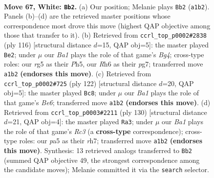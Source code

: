 \documentclass[11pt]{article}
\begin{document}
\clearpage

\begin{figure}[p]\centering
\begin{subfigure}{0.46\textwidth}\centering
\resizebox{\linewidth}{!}{%
\newchessgame
\chessboard[
  setfen={8/4k3/7R/pp4r1/b1p5/P1P5/3K4/B7 w - - 40 67},
  showmover=false,
  pgfstyle=straightmove, color=movearrow, markmove={a1-b2}
]}
\caption{}
\end{subfigure}\hfill
\begin{subfigure}{0.46\textwidth}\centering
\resizebox{\linewidth}{!}{%
\newchessgame
\chessboard[
  setfen={8/p5p1/Pbk4p/7P/4KPB1/8/8/8 w - - 23 59},
  showmover=false,
  pgfstyle=straightmove, color=movearrow, markmove={g4-e2}
]}
\caption{}
\end{subfigure}
\\[4pt]
\begin{subfigure}{0.46\textwidth}\centering
\resizebox{\linewidth}{!}{%
\newchessgame
\chessboard[
  setfen={8/8/4B3/1p4p1/3k1b1p/1P5P/6K1/8 w - - 2 62},
  showmover=false,
  pgfstyle=straightmove, color=movearrow, markmove={e6-c8}
]}
\caption{}
\end{subfigure}\hfill
\begin{subfigure}{0.46\textwidth}\centering
\resizebox{\linewidth}{!}{%
\newchessgame
\chessboard[
  setfen={1R6/3b3r/3P1k2/5p2/4p3/2R1P3/5K2/8 w - - 1 66},
  showmover=false,
  pgfstyle=straightmove, color=movearrow, markmove={c3-a3}
]}
\caption{}
\end{subfigure}
\caption{\textbf{Move 67, White: \texttt{Bb2}.} (a) Our position; Melanie plays \texttt{Bb2} (\texttt{a1b2}). Panels (b)--(d) are the retrieved master positions whose correspondence most drove this move (highest QAP objective among those that transfer to it). (b) Retrieved from \texttt{ccrl\_top\_p0002\#2838} (ply 116) [structural distance $d$=15, QAP obj=5]: the master played \texttt{Be2}; under $\mu$ our \emph{Ba1} plays the role of that game's \emph{Bg4}; cross-type roles: our \emph{r}g5 as their \emph{P}h5, our \emph{R}h6 as their \emph{p}g7; transferred move \texttt{a1b2} \textbf{(endorses this move)}. (c) Retrieved from \texttt{ccrl\_top\_p0002\#725} (ply 122) [structural distance $d$=20, QAP obj=5]: the master played \texttt{Bc8}; under $\mu$ our \emph{Ba1} plays the role of that game's \emph{Be6}; transferred move \texttt{a1b2} \textbf{(endorses this move)}. (d) Retrieved from \texttt{ccrl\_top\_p0003\#2211} (ply 130) [structural distance $d$=21, QAP obj=4]: the master played \texttt{Ra3}; under $\mu$ our \emph{Ba1} plays the role of that game's \emph{Rc3} (a \textbf{cross-type} correspondence); cross-type roles: our \emph{p}a5 as their \emph{r}h7; transferred move \texttt{a1b2} \textbf{(endorses this move)}. Synthesis: 13 retrieved analogs transferred to \texttt{Bb2} (summed QAP objective 49, the strongest correspondence among the candidate moves); Melanie committed it via the \texttt{search} selector.}
\label{fig:thought-m132}
\end{figure}
\end{document}
